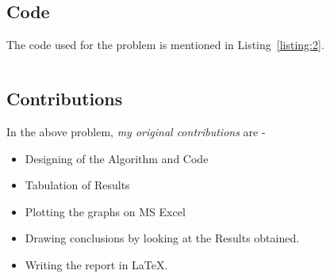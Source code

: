 \documentclass[titlepage, 11pt]{article}
\begin{document}

\subsection{Code}
The code used for the problem is mentioned in Listing~\ref{listing:2}. 
 
\inputminted[breaklines,
 mathescape,
 linenos,
 numbersep=5pt,
 frame=single,
 numbersep=5pt,
 xleftmargin=0pt]{c}{A5P1.c}
\label{listing:2}


\subsection{Contributions}
In the above problem, \textit{my original contributions} are - 
\begin{itemize}
    \item Designing of the Algorithm and Code
    \item Tabulation of Results
    \item Plotting the graphs on MS Excel
    \item Drawing conclusions by looking at the Results obtained.
    \item Writing the report in LaTeX. 
\end{itemize}

\end{document}
